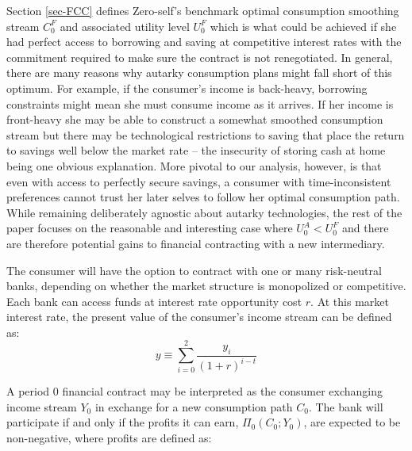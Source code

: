 \documentclass[11pt,english]{article}
\theoremstyle{plain}
\theoremstyle{definition}
\begin{document}
Section
\ref{sec-FCC} defines Zero-self's benchmark optimal consumption
smoothing stream $C_{0}^{F}$ and associated utility level $U_{0}^{F}$
which is what could be achieved if she had perfect access to borrowing
and saving at competitive interest rates with the commitment required
to make sure the contract is not renegotiated. In general, there are
many reasons why  autarky consumption plans might fall short
of this optimum. For example, if the
consumer's income is back-heavy, borrowing constraints might mean
she must consume  income as it arrives. If her income is front-heavy
she may be able to construct a somewhat smoothed consumption
stream but there may be technological restrictions to saving that
place the return to savings well below the market rate -- the insecurity
of storing cash at home being one obvious explanation. More pivotal
to our analysis, however, is that even with access to perfectly
secure savings, a consumer with time-inconsistent preferences cannot
trust her later selves to follow her optimal consumption path. 
While remaining deliberately agnostic about autarky technologies,
the rest of the paper focuses on the reasonable and interesting case
where $U_{0}^{A}<U_{0}^{F}$ and there are therefore potential gains
to financial contracting with a new intermediary.

The consumer will have the option to contract with one or many risk-neutral
banks, depending on whether the market structure is monopolized or
competitive. Each bank can access funds at interest rate opportunity cost $r$. At this
market interest rate, the present value of the consumer's income stream
can be defined as:
\begin{equation}
y\equiv\sum\limits _{i=0}^{2}\frac{y_{i}}{\left(1+r\right)^{i-t}}
\end{equation}

A period 0 financial  contract may be interpreted as the consumer exchanging income stream $Y_{0}$ in exchange for a new consumption path $C_{0}$. The bank will participate if and only if the profits it can earn, $\Pi_{0}(C_{0};Y_{0})$, are
expected to be non-negative, where profits are defined as:
\end{document}
